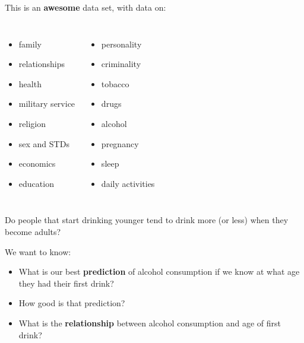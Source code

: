 \documentclass{beamer}\usepackage[]{graphicx}\usepackage[]{color}
\begin{document}
\begin{darkframes}
    \begin{frame}
      This is an \textbf{awesome} data set, with data on:
      \begin{columns}[onlytextwidth]
          \begin{itemize}
            \item family
            \item relationships
            \item health
            \item military service
            \item religion
            \item sex and STDs
            \item economics
            \item education
          \end{itemize}
          \begin{itemize}
            \item personality
            \item criminality
            \item tobacco
            \item drugs
            \item alcohol
            \item pregnancy
            \item sleep
            \item daily activities
          \end{itemize}
      \end{columns}
    \end{frame}

    \begin{frame}
      \begin{center}
        Do people that start drinking younger tend to drink more (or less) when they become adults?
      \end{center}
      \bigskip\pause
      We want to know:
      \begin{itemize}[<+->]
        \item What is our best \textbf{prediction} of alcohol consumption if we know at what age they had their first drink?
        \item How good is that prediction?
        \item What is the \textbf{relationship} between alcohol consumption and age of first drink?
      \end{itemize}
    \end{frame}


\end{darkframes}
\end{document}
